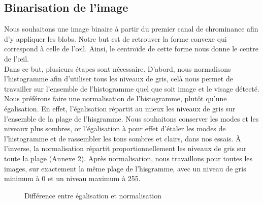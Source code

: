 \subsection{Binarisation de l'image}
Nous souhaitons une image binaire à partir du premier canal de chrominance afin d'y appliquer les blobs. 
Notre but est de retrouver la forme convexe qui correspond à celle de l'œil. Ainsi, le centroïde de cette 
forme nous donne le centre de l'œil.\\

Dans ce but, plusieurs étapes sont nécessaire. D'abord, nous normalisons l'histogramme afin d'utiliser 
tous les niveaux de gris, celà nous permet de travailler sur l'ensemble de l'histogramme quel que soit
image et le visage détecté. Nous préférons faire une normalisation de l'histogramme, plutôt qu'une 
égalisation. En effet, l'égalisation répartit au mieux les niveaux de gris sur l'ensemble de 
la plage de l'hisgramme. Nous souhaitons conserver les modes et les niveaux plus sombres, or l'égalisation 
à pour effet d'étaler les modes de l'histogramme et de rassembler les tons sombres et clairs, dans nos essais. À l'inverse, 
la normalisation répartit proportionnellement les niveaux de gris sur toute la plage (Annexe 2). Après 
normalisation, nous travaillons pour toutes les images, sur exactement la même plage de l'hisgramme, avec un niveau de 
gris minimum à 0 et un niveau maximum à 255.\\

\begin{figure}[H]
  \centering
  \caption{Différence entre égalisation et normalisation}
\end{figure}

